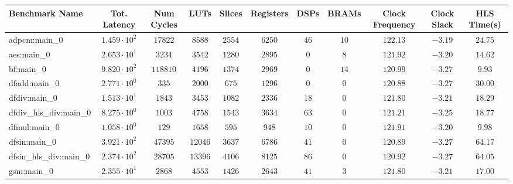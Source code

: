 \begin{tabular}{|l|c|c|c|c|c|c|c|c|c|c|}
\hline
Benchmark Name          & Tot. Latency           & Num Cycles & LUTs      & Slices    & Registers & DSPs    & BRAMs   & Clock Frequency & Clock Slack & HLS Time(s) \\
\hline
adpcm:main\_0           & $ 1.459 \cdot 10^{2} $ & $ 17822  $ & $ 8588  $ & $ 2554  $ & $ 6250  $ & $ 46  $ & $ 10  $ & $ 122.13      $ & $ -3.19   $ & $ 24.75   $ \\
aes:main\_0             & $ 2.653 \cdot 10^{1} $ & $ 3234   $ & $ 3542  $ & $ 1280  $ & $ 2895  $ & $ 0   $ & $ 8   $ & $ 121.92      $ & $ -3.20   $ & $ 14.62   $ \\
bf:main\_0              & $ 9.820 \cdot 10^{2} $ & $ 118810 $ & $ 4196  $ & $ 1374  $ & $ 2969  $ & $ 0   $ & $ 14  $ & $ 120.99      $ & $ -3.27   $ & $ 9.93    $ \\
dfadd:main\_0           & $ 2.771 \cdot 10^{0} $ & $ 335    $ & $ 2000  $ & $ 675   $ & $ 1296  $ & $ 0   $ & $ 0   $ & $ 120.88      $ & $ -3.27   $ & $ 30.00   $ \\
dfdiv:main\_0           & $ 1.513 \cdot 10^{1} $ & $ 1843   $ & $ 3453  $ & $ 1082  $ & $ 2336  $ & $ 18  $ & $ 0   $ & $ 121.80      $ & $ -3.21   $ & $ 18.29   $ \\
dfdiv\_hls\_div:main\_0 & $ 8.275 \cdot 10^{0} $ & $ 1003   $ & $ 4758  $ & $ 1543  $ & $ 3634  $ & $ 63  $ & $ 0   $ & $ 121.21      $ & $ -3.25   $ & $ 18.77   $ \\
dfmul:main\_0           & $ 1.058 \cdot 10^{0} $ & $ 129    $ & $ 1658  $ & $ 595   $ & $ 948   $ & $ 10  $ & $ 0   $ & $ 121.91      $ & $ -3.20   $ & $ 9.98    $ \\
dfsin:main\_0           & $ 3.921 \cdot 10^{2} $ & $ 47395  $ & $ 12046 $ & $ 3637  $ & $ 6786  $ & $ 41  $ & $ 0   $ & $ 120.89      $ & $ -3.27   $ & $ 64.17   $ \\
dfsin\_hls\_div:main\_0 & $ 2.374 \cdot 10^{2} $ & $ 28705  $ & $ 13396 $ & $ 4106  $ & $ 8125  $ & $ 86  $ & $ 0   $ & $ 120.92      $ & $ -3.27   $ & $ 64.05   $ \\
gsm:main\_0             & $ 2.355 \cdot 10^{1} $ & $ 2868   $ & $ 4553  $ & $ 1426  $ & $ 2643  $ & $ 41  $ & $ 3   $ & $ 121.80      $ & $ -3.21   $ & $ 17.00   $ \\

\end{tabular}
